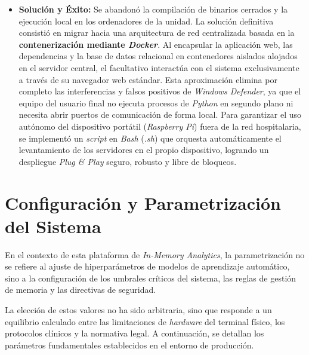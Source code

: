 \begin{itemize}
    \item \textbf{Solución y Éxito:} Se abandonó la compilación de binarios cerrados y la ejecución local en los ordenadores de la unidad. La solución definitiva consistió en migrar hacia una arquitectura de red centralizada basada en la \textbf{contenerización mediante \textit{Docker}}. Al encapsular la aplicación web, las dependencias y la base de datos relacional en contenedores aislados alojados en el servidor central, el facultativo interactúa con el sistema exclusivamente a través de su navegador web estándar. Esta aproximación elimina por completo las interferencias y falsos positivos de \textit{Windows Defender}, ya que el equipo del usuario final no ejecuta procesos de \textit{Python} en segundo plano ni necesita abrir puertos de comunicación de forma local. Para garantizar el uso autónomo del dispositivo portátil (\textit{Raspberry Pi}) fuera de la red hospitalaria, se implementó un \textit{script} en \textit{Bash} (\textit{.sh}) que orquesta automáticamente el levantamiento de los servidores en el propio dispositivo, logrando un despliegue \textit{Plug \& Play} seguro, robusto y libre de bloqueos.
\end{itemize}

\section{Configuración y Parametrización del Sistema}
En el contexto de esta plataforma de \textit{In-Memory Analytics}, la parametrización no se refiere al ajuste de hiperparámetros de modelos de aprendizaje automático, sino a la configuración de los umbrales críticos del sistema, las reglas de gestión de memoria y las directivas de seguridad. 

La elección de estos valores no ha sido arbitraria, sino que responde a un equilibrio calculado entre las limitaciones de \textit{hardware} del terminal físico, los protocolos clínicos y la normativa legal. A continuación, se detallan los parámetros fundamentales establecidos en el entorno de producción.

